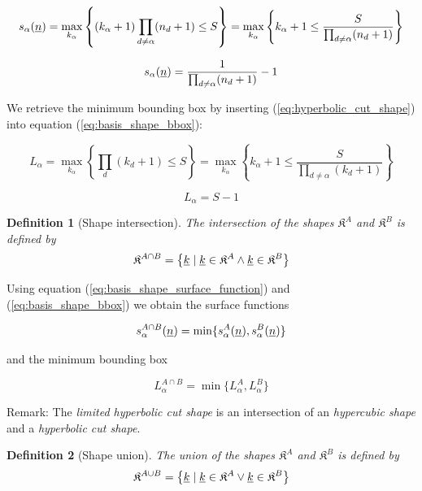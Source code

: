 \documentclass{article}
\newtheorem{definition}{Definition}
\begin{document}
\[
  s_{\alpha}(\underline{n})=
  \max_{k_{\alpha}}\left\{(k_{\alpha}+1)\prod_{d \neq \alpha} (n_d+1) \leq S \right\} =
  \max_{k_{\alpha}}\left\{k_{\alpha}+1 \leq \frac{S}{\prod_{d \neq \alpha}(n_d+1)}\right\}
\]

\begin{equation}
s_{\alpha}(\underline{n})=\frac{1}{\prod_{d \neq \alpha} (n_d+1)}-1
\end{equation}

We retrieve the minimum bounding box by inserting (\ref{eq:hyperbolic_cut_shape}) into
equation (\ref{eq:basis_shape_bbox}):

\[
  L_{\alpha}=\max_{k_{\alpha}}\left\{\prod_d(k_d+1) \leq S\right\} =
  \max_{k_{\alpha}}\left\{k_{\alpha}+1 \leq \frac{S}{\prod_{d \neq \alpha}(k_d+1)}\right\}
\]

\begin{equation}
L_{\alpha}=S-1
\end{equation}

\begin{definition}[Shape intersection]
  The intersection of the shapes \(\mathfrak{K}^{A}\) and \(\mathfrak{K}^{B}\) is defined by
  \begin{equation}
    \label{eq:basis_shape_intersection}
    \mathfrak{K}^{A \cap B}=\left\{\underline{k} \;|\; \underline{k} \in \mathfrak{K}^A \land
      \underline{k} \in \mathfrak{K}^B
    \right\}
  \end{equation}
\end{definition}

Using equation (\ref{eq:basis_shape_surface_function}) and (\ref{eq:basis_shape_bbox})
we obtain the surface functions

\begin{equation}
  s_{\alpha}^{A \cap B}(\underline{n}) = \min\{s_{\alpha}^A(\underline{n}), s_{\alpha}^B(\underline{n})\}
\end{equation}

and the minimum bounding box

\begin{equation}
  L_{\alpha}^{A \cap B} = \min\{L_{\alpha}^{A}, L_{\alpha}^{B}\}
\end{equation}

Remark: The \emph{limited hyperbolic cut shape} is an intersection of an
\emph{hypercubic shape} and a \emph{hyperbolic cut shape}.

\begin{definition}[Shape union]
  The union of the shapes \(\mathfrak{K}^{A}\) and \(\mathfrak{K}^{B}\) is defined by
  \begin{equation}
    \label{eq:basis_shape_intersection}
    \mathfrak{K}^{A \cup B}=\left\{\underline{k} \;|\; \underline{k} \in \mathfrak{K}^A \lor
      \underline{k} \in \mathfrak{K}^B
    \right\}
  \end{equation}
\end{definition}
\end{document}
